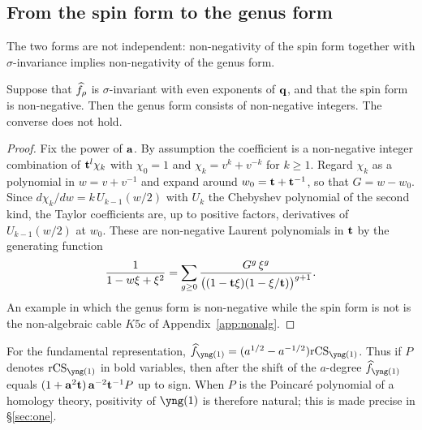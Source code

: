 \subsection{From the spin form to the genus form}
The two forms are not independent: non-negativity of the spin form together with $\sigma$-invariance implies non-negativity of the genus form.
\begin{lemma}\label{lem:G}
Suppose that $\widehat{f}_\rho$ is $\sigma$-invariant with even exponents of $\mathbf{q}$, and that the spin form is non-negative.
Then the genus form consists of non-negative integers. The converse does not hold.
\end{lemma}
\begin{proof}
Fix the power of $\mathbf{a}$. By assumption the coefficient is a non-negative integer combination of $\mathbf{t}^l\chi_k$ with $\chi_0=1$ and $\chi_k=v^k+v^{-k}$ for $k\ge1$.
Regard $\chi_k$ as a polynomial in $w=v+v^{-1}$ and expand around $w_0=\mathbf{t}+\mathbf{t}^{-1}$, so that $G=w-w_0$.
Since $d\chi_k/dw=k\,U_{k-1}(w/2)$ with $U_k$ the Chebyshev polynomial of the second kind, the Taylor coefficients are, up to positive factors, derivatives of $U_{k-1}(w/2)$ at $w_0$.
These are non-negative Laurent polynomials in $\mathbf{t}$ by the generating function
\[
\frac{1}{1-w\xi+\xi^2}=\sum_{g\ge0}\frac{G^g\,\xi^g}{\bigl((1-\mathbf{t} \xi)(1-\xi/\mathbf{t})\bigr)^{g+1}} .
\]
An example in which the genus form is non-negative while the spin form is not is the non-algebraic cable $K5c$ of Appendix~\ref{app:nonalg}.
\end{proof}

For the fundamental representation, $\hf_{\yng(1)}=(a^{1/2}-a^{-1/2})\rCS_{\yng(1)}$.
Thus if $P$ denotes $\rCS_{\yng(1)}$ in bold variables, then after the shift of the $a$-degree $\hf_{\yng(1)}$ equals $(1+\mathbf{a}^2\mathbf{t})\,\mathbf{a}^{-2}\mathbf{t}^{-1}P$ up to sign.
When $P$ is the Poincar\'e polynomial of a homology theory, positivity of $\yng(1)$ is therefore natural; this is made precise in \S\ref{sec:one}.
